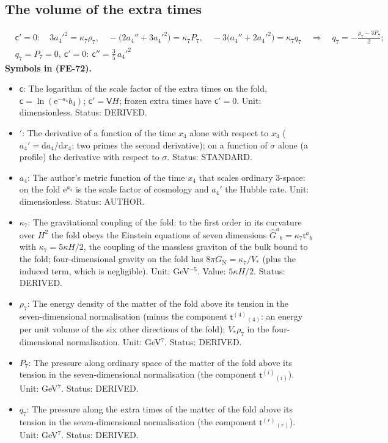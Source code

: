 \documentclass[
  10pt,
]{article}
\providecommand{\tightlist}{%
  \setlength{\itemsep}{0pt}\setlength{\parskip}{0pt}}
\begin{document}
\hypertarget{the-volume-of-the-extra-times}{%
\subsection{The volume of the extra
times}\label{the-volume-of-the-extra-times}}

\[
\begin{aligned}
&\mathsf{c}' = 0:\quad 3a_4'^2 = \kappa_7\rho_7,\quad -\big(2a_4'' + 3a_4'^2\big) = \kappa_7P_7,\quad
 -3\big(a_4'' + 2a_4'^2\big) = \kappa_7q_7\quad\Rightarrow\quad q_7 = -\frac{\rho_7 - 3P_7}{2};\\
&q_7 = P_7 = 0,\ \mathsf{c}' = 0:\ \mathsf{c}'' = \frac35\,a_4'^2
\end{aligned} \tag{FE-72}
\] \textbf{Symbols in (FE-72).}

\begin{itemize}
\tightlist
\item
  \(\mathsf{c}\): The logarithm of the scale factor of the extra times
  on the fold, \(\mathsf{c} = \ln(\mathrm{e}^{-a_4}b_4)\);
  \(\mathsf{c}' = \mathsf{V}H\); frozen extra times have
  \(\mathsf{c}' = 0\). Unit: dimensionless. Status: DERIVED.
\item
  \({}'\): The derivative of a function of the time \(x_4\) alone with
  respect to \(x_4\) (\(a_4' = \mathrm{d}a_4/\mathrm{d}x_4\); two primes
  the second derivative); on a function of \(\sigma\) alone (a profile)
  the derivative with respect to \(\sigma\). Status: STANDARD.
\item
  \(a_4\): The author's metric function of the time \(x_4\) that scales
  ordinary 3-space: on the fold \(\mathrm{e}^{a_4}\) is the scale factor
  of cosmology and \(a_4'\) the Hubble rate. Unit: dimensionless.
  Status: AUTHOR.
\item
  \(\kappa_7\): The gravitational coupling of the fold: to the first
  order in its curvature over \(H^2\) the fold obeys the Einstein
  equations of seven dimensions
  \(\hat G^a{}_b = \kappa_7\mathsf{t}^a{}_b\) with
  \(\kappa_7 = 5\kappa H/2\), the coupling of the massless graviton of
  the bulk bound to the fold; four-dimensional gravity on the fold has
  \(8\pi G_{\mathrm{N}} = \kappa_7/V_*\) (plus the induced term, which
  is negligible). Unit: GeV\(^{-5}\). Value: \(5\kappa H/2\). Status:
  DERIVED.
\item
  \(\rho_7\): The energy density of the matter of the fold above its
  tension in the seven-dimensional normalisation (minus the component
  \(\mathsf{t}^{(4)}{}_{(4)}\): an energy per unit volume of the six
  other directions of the fold); \(V_*\rho_7\) in the four-dimensional
  normalisation. Unit: GeV\(^7\). Status: DERIVED.
\item
  \(P_7\): The pressure along ordinary space of the matter of the fold
  above its tension in the seven-dimensional normalisation (the
  component \(\mathsf{t}^{(i)}{}_{(i)}\)). Unit: GeV\(^7\). Status:
  DERIVED.
\item
  \(q_7\): The pressure along the extra times of the matter of the fold
  above its tension in the seven-dimensional normalisation (the
  component \(\mathsf{t}^{(r)}{}_{(r)}\)). Unit: GeV\(^7\). Status:
  DERIVED.
\end{itemize}
\end{document}
